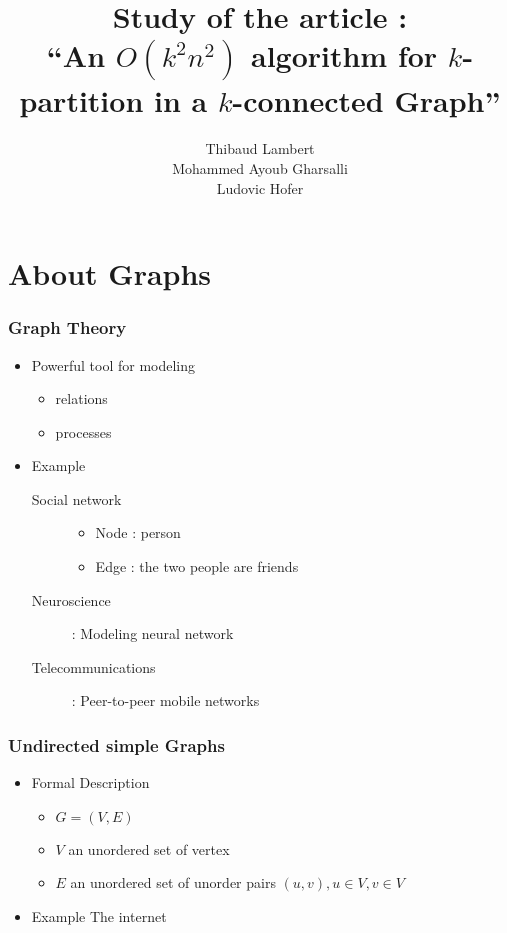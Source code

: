 \documentclass[xcolor=dvipsnames]{beamer}
\title[$O(k^2n^2)$ algorithm for $k$-partitionning]{Study of the article :\\``An $O(k^2n^2)$ algorithm for $k$-partition in a $k$-connected Graph''}
\author[Lambert, Gharsalli, Hofer]
       {Thibaud Lambert\\Mohammed Ayoub Gharsalli\\Ludovic Hofer}
\institute{University of Bordeaux I}
\begin{document}
\begin{frame}[plain]
  \maketitle
\end{frame}

\begin{frame}[plain]
  \tableofcontents
\end{frame}

\section{About Graphs}

\begin{frame}
  \frametitle{Graph Theory}
  \begin{itemize}
  \item Powerful tool for modeling
    \begin{itemize}
    \item relations
    \item processes
    \end{itemize}
  \item Example
    \begin{description}
     \item [Social network]
      \begin{itemize}
      \item Node : person
      \item Edge : the two people are friends
      \end{itemize}
     \item [Neuroscience] : Modeling neural network  \cite{BuSp09}
     \item [Telecommunications] : Peer-to-peer mobile networks  \cite{FaCh99}
    \end{description}
  \end{itemize}
\end{frame}

\begin{frame}
  \frametitle{Undirected simple Graphs}
  \begin{itemize}
    \item Formal Description
      \begin{itemize}
      \item $G = (V,E)$
      \item $V$ an unordered set of vertex
      \item $E$ an unordered set of unorder pairs $(u,v), u \in V, v \in V$
      \end{itemize}
    \item Example
    	The internet
  \end{itemize}
\end{frame}
\end{document}
